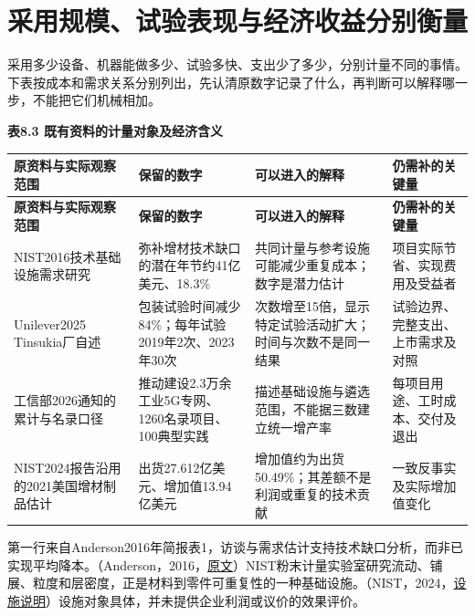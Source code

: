 \documentclass[UTF8,fontset=windows,12pt,a4paper,oneside,openany]{ctexbook}
\begin{document}
\section{采用规模、试验表现与经济收益分别衡量}

采用多少设备、机器能做多少、试验多快、支出少了多少，分别计量不同的事情。下表按成本和需求关系分别列出，先认清原数字记录了什么，再判断可以解释哪一步，不能把它们机械相加。

\textbf{表8.3 既有资料的计量对象及经济含义}

\begingroup\footnotesize\setlength{\tabcolsep}{4pt}\renewcommand{\arraystretch}{1.25}
\begin{longtable}{>{\raggedright\arraybackslash}p{}>{\raggedright\arraybackslash}p{}>{\raggedright\arraybackslash}p{}>{\raggedright\arraybackslash}p{}}
\toprule
\textbf{原资料与实际观察范围} & \textbf{保留的数字} & \textbf{可以进入的解释} & \textbf{仍需补的关键量} \\
\midrule\endfirsthead
\toprule
\textbf{原资料与实际观察范围} & \textbf{保留的数字} & \textbf{可以进入的解释} & \textbf{仍需补的关键量} \\
\midrule\endhead
\bottomrule\endfoot
NIST2016技术基础设施需求研究 & 弥补增材技术缺口的潜在年节约41亿美元、18.3\% & 共同计量与参考设施可能减少重复成本；数字是潜力估计 & 项目实际节省、实现费用及受益者 \\
Unilever2025 Tinsukia厂自述 & 包装试验时间减少84\%；每年试验2019年2次、2023年30次 & 次数增至15倍，显示特定试验活动扩大；时间与次数不是同一结果 & 试验边界、完整支出、上市需求及对照 \\
工信部2026通知的累计与名录口径 & 推动建设2.3万余工业5G专网、1260名录项目、100典型实践 & 描述基础设施与遴选范围，不能据三数建立统一增产率 & 每项目用途、工时成本、交付及退出 \\
NIST2024报告沿用的2021美国增材制品估计 & 出货27.612亿美元、增加值13.94亿美元 & 增加值约为出货50.49\%；其差额不是利润或重复的技术贡献 & 一致反事实及实际增加值变化 \\
\end{longtable}\endgroup


第一行来自Anderson2016年简报表1，访谈与需求估计支持技术缺口分析，而非已实现平均降本。（Anderson，2016，\href{https://www.nist.gov/system/files/documents/2024/12/05/NIST.EAB_.1_R_1.pdf}{原文}）NIST粉末计量实验室研究流动、铺展、粒度和层密度，正是材料到零件可重复性的一种基础设施。（NIST，2024，\href{https://www.nist.gov/laboratories/tools-instruments/additive-manufacturing-powder-metrology-laboratory}{设施说明}）设施对象具体，并未提供企业利润或议价的效果评价。
\end{document}
